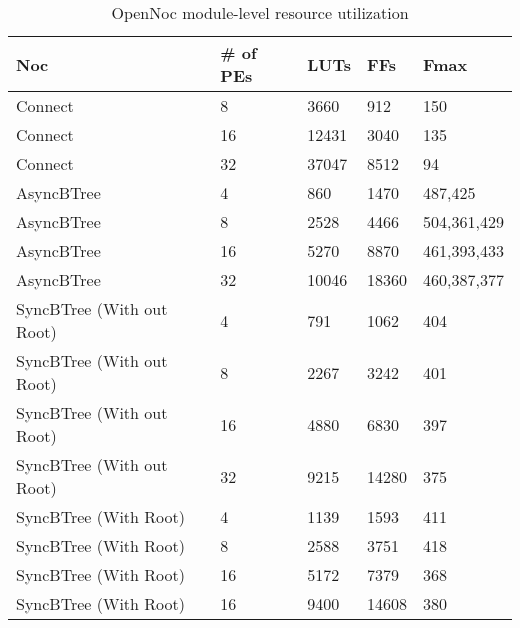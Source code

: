 \begin{table}[!t]
  \centering
  \caption{OpenNoc module-level resource utilization} 
  \begin{tabular}{l|l|l|l|l}
      \toprule
      Noc & \# of PEs & LUTs & FFs & Fmax \\
      \midrule
      \midrule
      Connect & 8      & 3660 & 912 & 150  \\
      Connect & 16     & 12431 & 3040 & 135 \\
      Connect & 32     & 37047 & 8512 & 94 \\    
      \midrule
      AsyncBTree & 4         & 860  & 1470 & 487,425\\
      AsyncBTree & 8         & 2528 & 4466 & 504,361,429\\
      AsyncBTree & 16        & 5270 & 8870 & 461,393,433 \\
      AsyncBTree & 32        & 10046 & 18360 & 460,387,377\\
      \midrule
      SyncBTree (With out Root) &  4         &  791 & 1062 & 404\\
      SyncBTree (With out Root) &  8         &  2267 & 3242 & 401\\
      SyncBTree (With out Root) &  16        &  4880 & 6830 & 397\\
      SyncBTree (With out Root) &  32        &  9215 & 14280 & 375\\
      \midrule      
      SyncBTree (With Root) &  4         &  1139 & 1593 & 411\\
      SyncBTree (With Root) &  8         &  2588 & 3751 & 418\\
      SyncBTree (With Root) &  16         &  5172 & 7379 & 368\\ 
      SyncBTree (With Root) &  16         &  9400 & 14608 & 380\\ 
      \bottomrule
    \end{tabular}
	\label{table:systemResourceConsumption}
\end{table}